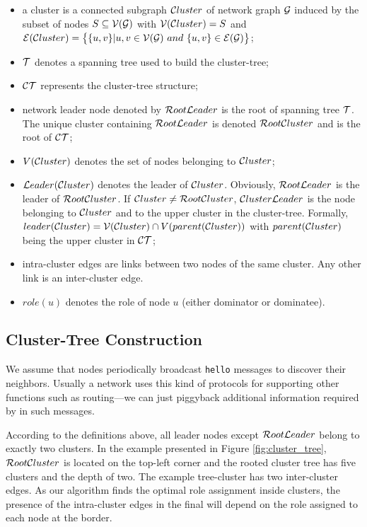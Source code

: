 \documentclass[twoside]{article}
\begin{document}
\begin{itemize}
\item a cluster is a connected subgraph $\mathcal{C}luster$ of network graph
  $\mathcal{G}$ induced by the subset of nodes $S\subseteq \mathcal{V}(\mathcal{G})$ with
  $\mathcal{V}(\mathcal{C}luster)=S$ and $\mathcal{E}(\mathcal{C}luster) = \big\{\{u,v\}| u,v\in \mathcal{V}(\mathcal{G}) \
  and\ \{u,v\}\in \mathcal{E}(\mathcal{G})\big\}$;
	
	\item $\mathcal{T}$ denotes a spanning tree used to build the cluster-tree;
	
	\item $\mathcal{CT}$ represents the cluster-tree structure; 
	
	\item network leader node denoted by $\mathcal{R}oot\mathcal{L}eader$ is the
          root of spanning tree $\mathcal{T}$. The unique cluster containing
          $\mathcal{R}oot\mathcal{L}eader$ is denoted $\mathcal{R}oot\mathcal{C}luster$ and is the root of
          $\mathcal{CT}$;
	
	\item $V(\mathcal{C}luster)$ denotes the set of nodes belonging to $\mathcal{C}luster$;
		
	\item $\mathcal{L}eader(\mathcal{C}luster)$ denotes the leader of $\mathcal{C}luster$. Obviously, $\mathcal{R}oot\mathcal{L}eader$ is the leader of $\mathcal{R}oot\mathcal{C}luster$. If $\mathcal{C}luster \neq \mathcal{R}oot\mathcal{C}luster$, $\mathcal{C}luster\mathcal{L}eader$ is the node belonging to $\mathcal{C}luster$ and to the upper cluster in the cluster-tree. Formally, $leader(\mathcal{C}luster) = \mathcal{V}(\mathcal{C}luster) \cap V(parent(\mathcal{C}luster))$ with $parent(\mathcal{C}luster)$ being the upper cluster in $\mathcal{CT}$;
	
	\item intra-cluster edges are links between two nodes of the
          same cluster. Any other link is an inter-cluster edge.
	
	\item $role(u)$ denotes the role of node $u$ (either dominator
          or dominatee). 
\end{itemize}

\subsection{Cluster-Tree Construction}

We assume that nodes periodically broadcast
\texttt{hello} messages to discover their neighbors. Usually a network
uses this kind of protocols for supporting other functions
such as routing---we can just piggyback additional information
required by \potatoes in such messages. 

According to the definitions above, all leader nodes except
$\mathcal{R}oot\mathcal{L}eader$ belong to exactly two clusters. In the example presented
in Figure \ref{fig:cluster_tree}, $\mathcal{R}oot\mathcal{C}luster$ is located on the
top-left corner and the rooted cluster tree has five clusters and the
depth of two. The example tree-cluster has two inter-cluster edges.
As our algorithm finds the optimal role assignment inside clusters,
the presence of the intra-cluster edges in the final \rwcds will
depend on the role assigned to each node at the border.
\end{document}
